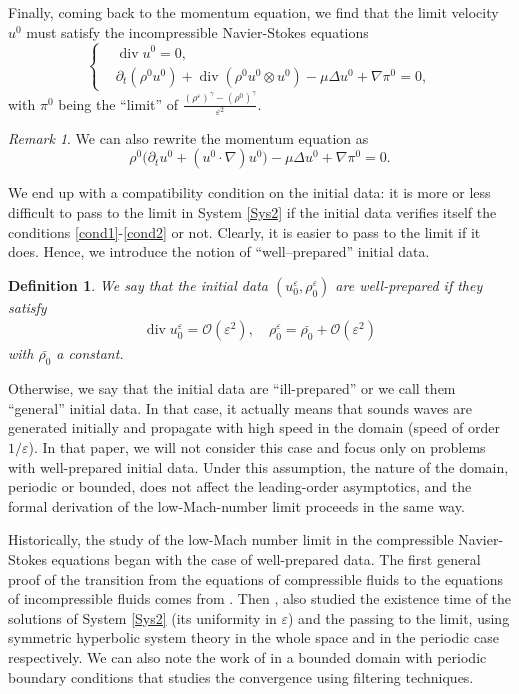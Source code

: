 \documentclass[11pt, twoside, a4paper]{article}
\theoremstyle{plain}
\newtheorem{definition}[theorem]{Definition}
\theoremstyle{remark}
\newtheorem{remark}[theorem]{Remark}
\numberwithin{equation}{section}
\renewcommand{\div}{\operatorname{div}}
\newcommand{\dt}{\partial_t}
\newcommand{\eps}{\varepsilon}
\newcommand{\bigO}{\mathcal{O}}
\begin{document}
Finally, coming back to the momentum equation, we find that the limit velocity $u^0$ must satisfy the incompressible Navier-Stokes equations
\begin{equation*}
\left\{
\begin{aligned}
   &\div u^0 =0,\\
   &\dt (\rho^0 u^0) + \div (\rho^0 u^0 \otimes u^0) - \mu \Delta u^0 + \nabla \pi^0 = 0, 
\end{aligned}
\right.
\end{equation*}
with $\pi^0$ being the ``limit'' of $\frac{(\rho^\eps)^\gamma-(\rho^0)^\gamma}{\eps^2}$.

\begin{remark}
We can also rewrite the momentum equation as
$$ \rho^0 \Big( \dt u^0 + (u^0 \cdot \nabla) u^0 \Big)- \mu \Delta u^0 + \nabla \pi^0 = 0.  $$
\end{remark}

We end up with a compatibility condition on the initial data: it is more or less difficult to pass to the limit in System \eqref{Sys2} if the initial data verifies itself the conditions \eqref{cond1}-\eqref{cond2} or not. Clearly, it is easier to pass to the limit if it does.  Hence, we introduce the notion of ``well--prepared'' initial data. 

\begin{definition}\label{defwpd} We say that the initial data $(u_0^\eps, \rho_0^\eps)$ are well-prepared if they satisfy
\begin{align*}
    \div u_0^\eps = \bigO(\eps^2), \quad  \rho_0^\eps = \bar{\rho_0} + \bigO(\eps^2)
\end{align*}
with $\bar{\rho_0}$ a constant.
\end{definition}

Otherwise, we say that the initial data are ``ill-prepared'' or we call them ``general'' initial data. In that case, it actually means that sounds waves are generated initially and propagate with high speed in the domain (speed of order $1/\eps$). In that paper, we will not consider this case and focus only on problems with well-prepared initial data. Under this assumption, the nature of the domain, periodic or bounded, does not affect the leading-order asymptotics, and the formal derivation of the low-Mach-number limit proceeds in the same way.

Historically, the study of the low-Mach number limit in the compressible Navier-Stokes equations began with the case of well-prepared data. The first general proof of the transition from the equations of compressible fluids to the equations of incompressible fluids comes from \cite{ebin1977motion}. Then \cite{klainerman1981singular}, \cite{klainerman1982compressible} also studied the existence time of the solutions of System \eqref{Sys2} (its uniformity in $\eps$) and the passing to the limit, using symmetric hyperbolic system theory in the whole space and in the periodic case respectively. We can also note the work of \cite{schochet1986compressible} in a bounded domain with periodic boundary conditions that studies the convergence using filtering techniques.
\end{document}
